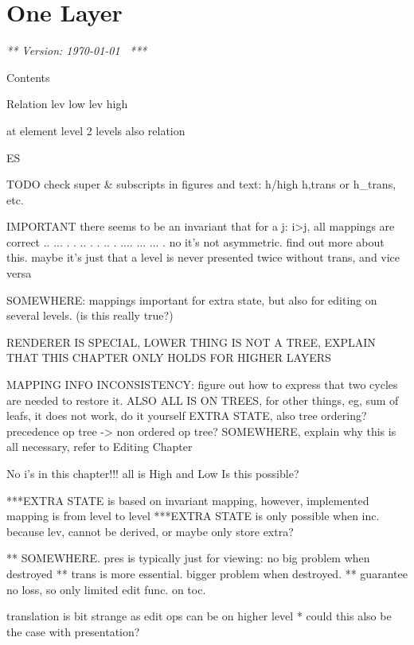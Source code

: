 \chapter{One Layer}
\label{chap:singleLayer}

{\em *** Version: \today~ ***}
\bc



Contents


Relation
lev low lev high

at element level 2 levels also relation

ES






TODO
check super & subscripts in figures and text: h/high h,trans or h_trans, etc.


IMPORTANT there seems to be an invariant that for a j:  i>j, all mappings are correct 
  ..           ...       
 .  .    ..   .   .   .. 
.    ....  ...     ...  .
 no it's not asymmetric. find out more about this.
 maybe it's just that a level is never presented twice without trans, and vice versa


SOMEWHERE: mappings important for extra state, but also for editing on several levels. (is this really true?)

RENDERER IS SPECIAL, LOWER THING IS NOT A TREE, EXPLAIN THAT THIS CHAPTER ONLY HOLDS FOR HIGHER LAYERS

MAPPING INFO INCONSISTENCY: figure out how to express that two cycles are needed to restore it.
ALSO ALL IS ON TREES, for other things, eg, sum of leafs, it does not work, do it yourself
EXTRA STATE, also tree ordering? precedence op tree -> non ordered op tree?
SOMEWHERE, explain why this is all necessary, refer to Editing Chapter

No i's in this chapter!!! all is High and Low Is this possible?

***EXTRA STATE is based on invariant mapping, however, implemented mapping is from level to level
***EXTRA STATE is only possible when inc. because lev, cannot be derived, or maybe only store extra?

** SOMEWHERE. pres is typically just for viewing: no big problem when destroyed
** trans is more essential. bigger problem when destroyed.
** guarantee no loss, so only limited edit func. on toc.

translation is bit strange as edit ops can be on higher level
* could this also be the case with presentation?



